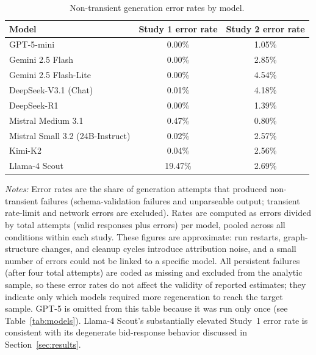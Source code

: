 %
\begin{table}[h]
    \centering
    \caption{Non-transient generation error rates by model.}
    \label{tab:validation-rates}
    \begin{threeparttable}
    \begin{tabular}{lcc}
        \toprule
        Model & Study 1 error rate & Study 2 error rate \\
        \midrule
        GPT-5-mini                       & 0.00\% & 1.05\% \\
        Gemini 2.5 Flash                 & 0.00\% & 2.85\% \\
        Gemini 2.5 Flash-Lite            & 0.00\% & 4.54\% \\
        DeepSeek-V3.1 (Chat)             & 0.01\% & 4.18\% \\
        DeepSeek-R1                      & 0.00\% & 1.39\% \\
        Mistral Medium 3.1               & 0.47\% & 0.80\% \\
        Mistral Small 3.2 (24B-Instruct) & 0.02\% & 2.57\% \\
        Kimi-K2                          & 0.04\% & 2.56\% \\
        Llama-4 Scout                    & 19.47\% & 2.69\% \\
        \bottomrule
    \end{tabular}
    \begin{tablenotes}\footnotesize
    \item \textit{Notes:} Error rates are the share of generation attempts
    that produced non-transient failures (schema-validation failures and
    unparseable output; transient rate-limit and network errors are
    excluded). Rates are computed as errors divided by total attempts
    (valid responses plus errors) per model, pooled across all conditions
    within each study. These figures are approximate: run restarts,
    graph-structure changes, and cleanup cycles introduce attribution
    noise, and a small number of errors could not be linked to a specific
    model. All persistent failures (after four total attempts) are coded as
    missing and excluded from the analytic sample, so these error rates do
    not affect the validity of reported estimates; they indicate only which
    models required more regeneration to reach the target sample. GPT-5 is
    omitted from this table because it was run only once (see
    Table~\ref{tab:models}). Llama-4 Scout's substantially elevated Study~1
    error rate is consistent with its degenerate bid-response behavior
    discussed in Section~\ref{sec:results}.
    \end{tablenotes}
    \end{threeparttable}
\end{table}